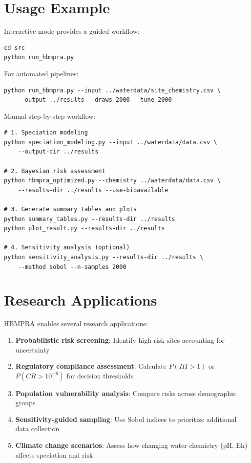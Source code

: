 \documentclass[11pt,a4paper]{article}
\begin{document}
\section{Usage Example}

Interactive mode provides a guided workflow:

\begin{verbatim}
cd src
python run_hbmpra.py
\end{verbatim}

For automated pipelines:

\begin{verbatim}
python run_hbmpra.py --input ../waterdata/site_chemistry.csv \
    --output ../results --draws 2000 --tune 2000
\end{verbatim}

Manual step-by-step workflow:

\begin{verbatim}
# 1. Speciation modeling
python speciation_modeling.py --input ../waterdata/data.csv \
    --output-dir ../results

# 2. Bayesian risk assessment
python hbmpra_optimized.py --chemistry ../waterdata/data.csv \
    --results-dir ../results --use-bioavailable

# 3. Generate summary tables and plots
python summary_tables.py --results-dir ../results
python plot_result.py --results-dir ../results

# 4. Sensitivity analysis (optional)
python sensitivity_analysis.py --results-dir ../results \
    --method sobol --n-samples 2000
\end{verbatim}

\section{Research Applications}

HBMPRA enables several research applications:

\begin{enumerate}
    \item \textbf{Probabilistic risk screening}: Identify high-risk sites accounting for uncertainty
    \item \textbf{Regulatory compliance assessment}: Calculate $P(HI > 1)$ or $P(CR > 10^{-6})$ for decision thresholds
    \item \textbf{Population vulnerability analysis}: Compare risks across demographic groups
    \item \textbf{Sensitivity-guided sampling}: Use Sobol indices \citep{Sobol:2001} to prioritize additional data collection
    \item \textbf{Climate change scenarios}: Assess how changing water chemistry (pH, Eh) affects speciation and risk
\end{enumerate}
\end{document}

